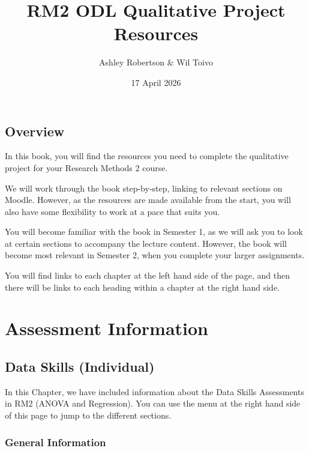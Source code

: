 \documentclass[
  english,
  letterpaper,
  DIV=11,
  numbers=noendperiod]{scrreprt}
\title{RM2 ODL Qualitative Project Resources}
\author{Ashley Robertson \& Wil Toivo}
\date{17 April 2026}
\renewcommand*\contentsname{Table of contents}
\newcommand\contentsname{Table of contents}
\begin{document}
\maketitle

\renewcommand*\contentsname{Table of contents}
{
\hypersetup{linkcolor=}
\setcounter{tocdepth}{2}
\tableofcontents
}


\chapter*{Overview}\label{overview}


In this book, you will find the resources you need to complete the
qualitative project for your Research Methods 2 course.

We will work through the book step-by-step, linking to relevant sections
on Moodle. However, as the resources are made available from the start,
you will also have some flexibility to work at a pace that suits you.

You will become familiar with the book in Semester 1, as we will ask you
to look at certain sections to accompany the lecture content. However,
the book will become most relevant in Semester 2, when you complete your
larger assignments.

You will find links to each chapter at the left hand side of the page,
and then there will be links to each heading within a chapter at the
right hand side.

\part{Assessment Information}

\chapter{Data Skills (Individual)}\label{ch1_data_skills}

In this Chapter, we have included information about the Data Skills
Assessments in RM2 (ANOVA and Regression). You can use the menu at the
right hand side of this page to jump to the different sections.

\section{General Information}\label{general-information}
\end{document}
